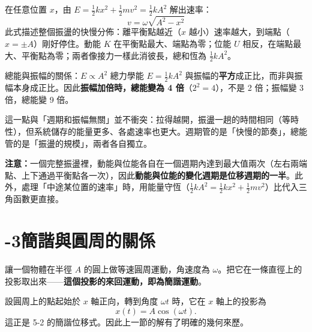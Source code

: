 \documentclass[11pt]{article}
\begin{document}
在任意位置 $x$，由 $E=\tfrac12 kx^2+\tfrac12 mv^2=\tfrac12 kA^2$ 解出速率：
$$\boxed{\;v=\omega\sqrt{A^2-x^2}\;}$$
此式描述整個振盪的快慢分佈：離平衡點越近（$x$ 越小）速率越大，到端點（$x=\pm A$）剛好停住。動能 $K$ 在平衡點最大、端點為零；位能 $U$ 相反，在端點最大、平衡點為零；兩者像接力一樣此消彼長，總和恆為 $\tfrac12 kA^2$。


\begin{補充框}{總能與振幅的關係：$E\propto A^2$}
總力學能 $E=\tfrac12 kA^2$ 與振幅的\textbf{平方}成正比，而非與振幅本身成正比。因此\textbf{振幅加倍時，總能變為 4 倍}（$2^2=4$），不是 2 倍；振幅變 3 倍，總能變 9 倍。

這一點與「週期和振幅無關」並不衝突：拉得越開，振盪一趟的時間相同（等時性），但系統儲存的能量更多、各處速率也更大。週期管的是「快慢的節奏」，總能管的是「振盪的規模」，兩者各自獨立。
\end{補充框}

\textbf{注意：}一個完整振盪裡，動能與位能各自在一個週期內達到最大值兩次（左右兩端點、上下通過平衡點各一次），因此\textbf{動能與位能的變化週期是位移週期的一半}。此外，處理「中途某位置的速率」時，用能量守恆（$\tfrac12 kA^2=\tfrac12 kx^2+\tfrac12 mv^2$）比代入三角函數更直接。

\section*{-3\quad 簡諧與圓周的關係}

讓一個物體在半徑 $A$ 的圓上做等速圓周運動，角速度為 $\omega$。把它在一條直徑上的投影取出來——\textbf{這個投影的來回運動，即為簡諧運動}。


設圓周上的點起始於 $x$ 軸正向，轉到角度 $\omega t$ 時，它在 $x$ 軸上的投影為
$$x(t)=A\cos(\omega t).$$
這正是 5-2 的簡諧位移式。因此上一節的解有了明確的幾何來歷。
\end{document}
